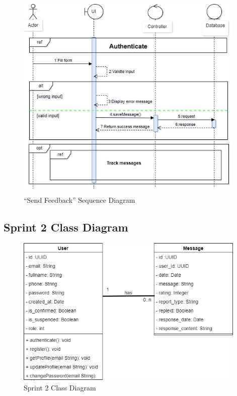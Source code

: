 \begin{figure}[H]
   
    
    \includegraphics[width=0.98\textwidth]{images/sprint4/feedbackSeq.png}
    \caption{“Send Feedback” Sequence Diagram}
    \label{fig:enter-label}
    
\end{figure}
\newpage
\subsection{Sprint 2 Class Diagram}
\begin{figure}[H]
   
    
    \includegraphics[width=0.98\textwidth]{images/sprint4/Sprint4ClassDiag.png}
    \caption{Sprint 2 Class Diagram}
    \label{fig:enter-label}
    
\end{figure}
\newpage
